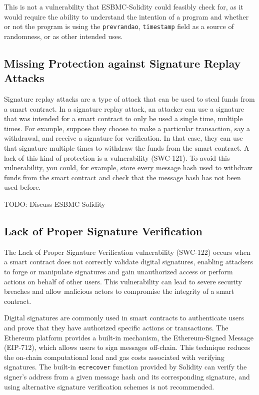 This is not a vulnerability that ESBMC-Solidity could feasibly check for, as it would require the ability to understand the intention of a program and whether or not the program is using the \verb|prevrandao|, \verb|timestamp| field as a source of randomness, or as other intended uses.

\subsection{Missing Protection against Signature Replay Attacks}
\label{sec:missing_protection_against_signature_replay_attacks}

Signature replay attacks are a type of attack that can be used to steal funds from a smart contract. In a signature replay attack, an attacker can use a signature that was intended for a smart contract to only be used a single time, multiple times. For example, suppose they choose to make a particular transaction, say a withdrawal, and receive a signature for verification. In that case, they can use that signature multiple times to withdraw the funds from the smart contract. A lack of this kind of protection is a vulnerability (SWC-121). To avoid this vulnerability, you could, for example, store every message hash used to withdraw funds from the smart contract and check that the message hash has not been used before.

TODO: Discuss ESBMC-Solidity

\subsection{Lack of Proper Signature Verification}
\label{sec:lack_of_proper_signature_verification}

The Lack of Proper Signature Verification vulnerability (SWC-122) occurs when a smart contract does not correctly validate digital signatures, enabling attackers to forge or manipulate signatures and gain unauthorized access or perform actions on behalf of other users. This vulnerability can lead to severe security breaches and allow malicious actors to compromise the integrity of a smart contract.

Digital signatures are commonly used in smart contracts to authenticate users and prove that they have authorized specific actions or transactions. The Ethereum platform provides a built-in mechanism, the Ethereum-Signed Message (EIP-712), which allows users to sign messages off-chain. This technique reduces the on-chain computational load and gas costs associated with verifying signatures. The built-in \verb|ecrecover| function provided by Solidity can verify the signer's address from a given message hash and its corresponding signature, and using alternative signature verification schemes is not recommended.

